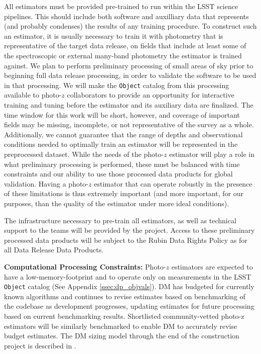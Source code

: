 \documentclass[DM,lsstdraft,toc]{lsstdoc}
\begin{document}
All estimators must be provided pre-trained to run within the LSST science pipelines. 
This should include both software and auxilliary data that represents (and probably condenses) the results of any training procedure.
To construct such an estimator, it is usually necessary to train it with photometry that is representative of the target data release, on fields that include at least some of the spectroscopic or external many-band photometry the estimator is trained against.
We plan to perform preliminary processing of small areas of sky prior to beginning full data release processing, in order to validate the software to be used in that processing.
We will make the {\tt Object} catalog from this processing available to photo-$z$ collaborators to provide an opportunity for interactive training and tuning before the estimator and its auxiliary data are finalized.
The time window for this work will be short, however, and coverage of important fields may be missing, incomplete, or not representative of the survey as a whole.
Additionally, we cannot guarantee that the range of depths and observational conditions needed to optimally train an estimator will be represented in the preprocessed dataset. 
While the needs of the photo-$z$ estimator will play a role in what preliminary processing is performed, these must be balanced with time constraints and our ability to use those processed data products for global validation.
Having a photo-$z$ estimator that can operate robustly in the presence of these limitations is thus extremely important (and more important, for our purposes, than the quality of the estimator under more ideal conditions).

The infrastructure necessary to pre-train all estimators, as well as technical support to the teams will be provided by the project. 
Access to these preliminary processed data products will be subject to the Rubin Data Rights Policy as for all Data Release Data Products. 
 
\textbf{Computational Processing Constraints:}
Photo-$z$ estimators are expected to have a low-memory-footprint and to operate only on measurements in the LSST {\tt Object} catalog (See Appendix \ref{ssec:dp_objvals}). 
DM has budgeted for currently known algorithms and continues to revise estimates based on benchmarking of the codebase as development progresses, updating estimates for future processing based on current benchmarking results.  
Shortlisted community-vetted photo-z estimators will be similarly benchmarked to enable DM to accurately revise budget estimates. 
The DM sizing model through the end of the construction project is described in \cite{dmtn-135}.
\end{document}
